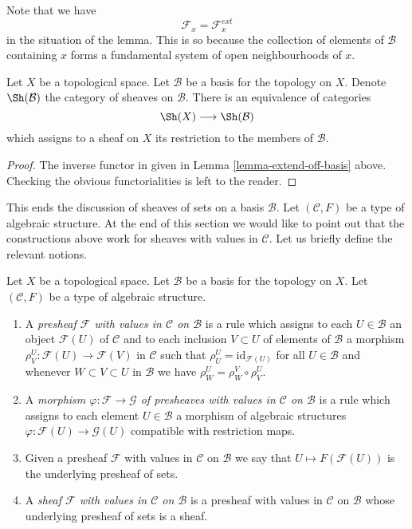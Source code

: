 \noindent
Note that we have
$$
\mathcal{F}_x = \mathcal{F}_x^{ext}
$$
in the situation of the lemma. This is so because the
collection of elements of $\mathcal{B}$ containing
$x$ forms a fundamental system of open neighbourhoods of $x$.

\begin{lemma}
\label{lemma-restrict-basis-equivalence}
Let $X$ be a topological space.
Let $\mathcal{B}$ be a basis for the topology on $X$.
Denote $\Sh(\mathcal{B})$ the category of
sheaves on $\mathcal{B}$.
There is an equivalence of categories
$$
\Sh(X) \longrightarrow \Sh(\mathcal{B})
$$
which assigns to a sheaf on $X$ its restriction to
the members of $\mathcal{B}$.
\end{lemma}

\begin{proof}
The inverse functor in given in Lemma \ref{lemma-extend-off-basis} above.
Checking the obvious functorialities is left to the
reader.
\end{proof}

\noindent
This ends the discussion of sheaves of sets on
a basis $\mathcal{B}$. Let $(\mathcal{C}, F)$ be
a type of algebraic structure. At the end of this section
we would like to point out that the constructions
above work for sheaves with values in $\mathcal{C}$.
Let us briefly define the relevant notions.

\begin{definition}
\label{definition-sheaf-structures-basis}
Let $X$ be a topological space. Let $\mathcal{B}$ be a
basis for the topology on $X$. Let $(\mathcal{C}, F)$ be
a type of algebraic structure.
\begin{enumerate}
\item A {\it presheaf $\mathcal{F}$ with values in $\mathcal{C}$
on $\mathcal{B}$} is a rule which assigns to each
$U \in \mathcal{B}$ an object
$\mathcal{F}(U)$ of $\mathcal{C}$ and to each inclusion $V \subset U$
of elements of $\mathcal{B}$ a morphism
$\rho^U_V : \mathcal{F}(U) \to \mathcal{F}(V)$ in $\mathcal{C}$ such that
$\rho^U_U = \text{id}_{\mathcal{F}(U)}$ for all $U \in \mathcal{B}$ and
whenever $W \subset V \subset U$ in $\mathcal{B}$ we have
$\rho^U_W = \rho^V_W \circ \rho ^U_V$.
\item A {\it morphism $\varphi : \mathcal{F} \to \mathcal{G}$
of presheaves with values in $\mathcal{C}$
on $\mathcal{B}$} is a rule which assigns to each
element $U \in \mathcal{B}$ a morphism of
algebraic structures $\varphi : \mathcal{F}(U) \to \mathcal{G}(U)$
compatible with restriction maps.
\item Given a presheaf $\mathcal{F}$ with values in $\mathcal{C}$
on $\mathcal{B}$ we say that $U \mapsto F(\mathcal{F}(U))$ is the
underlying presheaf of sets.
\item A {\it sheaf $\mathcal{F}$ with values in $\mathcal{C}$
on $\mathcal{B}$} is a presheaf with values in $\mathcal{C}$
on $\mathcal{B}$ whose underlying presheaf of sets is a sheaf.
\end{enumerate}
\end{definition}

